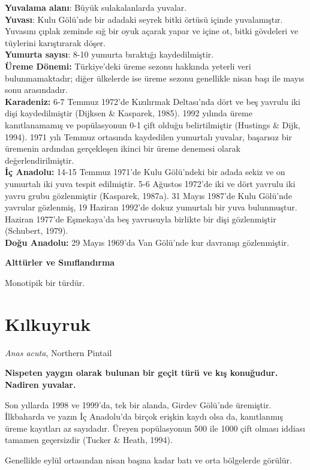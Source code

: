 \documentclass[
  a4paper,
  DIV=11,
  numbers=noendperiod]{scrreprt}
\begin{document}
\textbf{Yuvalama alanı}: Büyük sulakalanlarda yuvalar.\\
\textbf{Yuvası}: Kulu Gölü'nde bir adadaki seyrek bitki örtüsü içinde
yuvalamıştır. Yuvasını çıplak zeminde sığ bir oyuk açarak yapar ve içine
ot, bitki gövdeleri ve tüylerini karıştırarak döşer.\\
\textbf{Yumurta sayısı}: 8-10 yumurta bıraktığı kaydedilmiştir.\\
\textbf{Üreme Dönemi:} Türkiye'deki üreme sezonu hakkında yeterli veri
bulunmamaktadır; diğer ülkelerde ise üreme sezonu genellikle nisan başı
ile mayıs sonu arasındadır.\\
\textbf{Karadeniz:} 6-7 Temmuz 1972'de Kızılırmak Deltası'nda dört ve
beş yavrulu iki dişi kaydedilmiştir (Dijksen \& Kasparek, 1985). 1992
yılında üreme kanıtlanamamış ve popülasyonun 0-1 çift olduğu
belirtilmiştir (Hustings \& Dijk, 1994). 1971 yılı Temmuz ortasında
kaydedilen yumurtalı yuvalar, başarısız bir üremenin ardından
gerçekleşen ikinci bir üreme denemesi olarak değerlendirilmiştir.\\
\textbf{İç Anadolu:} 14-15 Temmuz 1971'de Kulu Gölü'ndeki bir adada
sekiz ve on yumurtalı iki yuva tespit edilmiştir. 5-6 Ağustos 1972'de
iki ve dört yavrulu iki yavru grubu gözlenmiştir (Kasparek, 1987a). 31
Mayıs 1987'de Kulu Gölü'nde yavrular gözlenmiş, 19 Haziran 1992'de dokuz
yumurtalı bir yuva bulunmuştur. Haziran 1977'de Eşmekaya'da beş
yavrusuyla birlikte bir dişi gözlenmiştir (Schubert, 1979).\\
\textbf{Doğu Anadolu:} 29 Mayıs 1969'da Van Gölü'nde kur davranışı
gözlenmiştir.

\textbf{Alttürler ve Sınıflandırma}

Monotipik bir türdür.

\section{Kılkuyruk}\label{kux131lkuyruk}

\emph{Anas acuta}, Northern Pintail

\textbf{Nispeten yaygın olarak bulunan bir geçit türü ve kış konuğudur.
Nadiren yuvalar.}

Son yıllarda 1998 ve 1999'da, tek bir alanda, Girdev Gölü'nde üremiştir.
İlkbaharda ve yazın İç Anadolu'da birçok erişkin kaydı olsa da,
kanıtlanmış üreme kayıtları az sayıdadır. Üreyen popülasyonun 500 ile
1000 çift olması iddiası tamamen geçersizdir (Tucker \& Heath, 1994).

Genellikle eylül ortasından nisan başına kadar batı ve orta bölgelerde
görülür.
\end{document}

